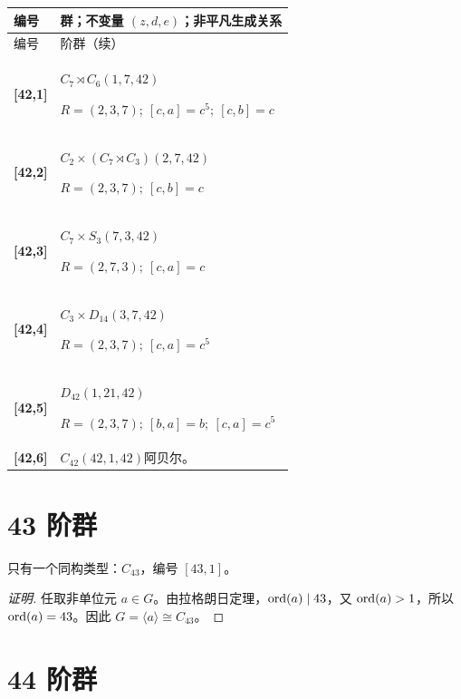 \documentclass[UTF8,fontset=fandol,11pt,a4paper]{ctexart}
\begin{document}
\begin{longtable}{@{}p{17mm}>{\raggedright\arraybackslash}p{141mm}@{}}

\toprule 编号 & 群；不变量 $(z,d,e)$；非平凡生成关系\\\midrule\endfirsthead

\toprule 编号 & 42 阶群（续）\\\midrule\endhead\bottomrule\endfoot

\textbf{[42,1]} & $C_{7}\rtimes C_{6}$\quad $(1,7,42)$\par\(R=(2,3,7);\allowbreak\ [c,a]=c^{5};\allowbreak\ [c,b]=c\)\\[3pt]

\textbf{[42,2]} & $C_{2}\times (C_{7}\rtimes C_{3})$\quad $(2,7,42)$\par\(R=(2,3,7);\allowbreak\ [c,b]=c\)\\[3pt]

\textbf{[42,3]} & $C_{7}\times S_{3}$\quad $(7,3,42)$\par\(R=(2,7,3);\allowbreak\ [c,a]=c\)\\[3pt]

\textbf{[42,4]} & $C_{3}\times D_{14}$\quad $(3,7,42)$\par\(R=(2,3,7);\allowbreak\ [c,a]=c^{5}\)\\[3pt]

\textbf{[42,5]} & $D_{42}$\quad $(1,21,42)$\par\(R=(2,3,7);\allowbreak\ [b,a]=b;\allowbreak\ [c,a]=c^{5}\)\\[3pt]

\textbf{[42,6]} & $C_{42}$\quad $(42,1,42)$\quad 阿贝尔。\\[3pt]

\end{longtable}\endgroup

\section*{43 阶群}\label{order:43}

只有一个同构类型：$C_{43}$，编号 $[43,1]$。

\begin{proof}[证明]
任取非单位元 $a\in G$。由拉格朗日定理，$\operatorname{ord}(a)\mid 43$，又 $\operatorname{ord}(a)>1$，所以 $\operatorname{ord}(a)=43$。因此 $G=\langle a\rangle\cong C_{43}$。
\end{proof}

\section*{44 阶群}\label{order:44}
\end{document}
